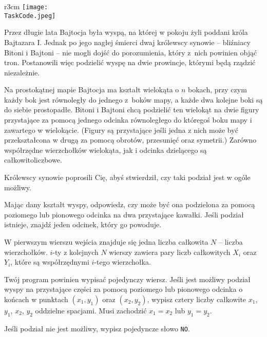 \documentclass{boi2014-pl}
\renewcommand{\TaskCode}{demarcation}
\newcommand{\constant}[1]{{\tt #1}}
\begin{document}
    \begin{wrapfigure}{r}{3cm}
        \vspace{-24pt}
		\texttt{[image: \\TaskCode.jpeg]}
	\end{wrapfigure}

    Przez długie lata Bajtocja była wyspą, na której w pokoju żyli poddani króla Bajtazara I.
  Jednak po jego nagłej śmierci dwaj królewscy synowie -- bliźniacy Bitoni i Bajtoni -- nie
  mogli dojść do porozumienia, który z~nich powinien objąć tron. Postanowili więc podzielić
  wyspę na dwie prowincje, którymi będą rządzić niezależnie.

  Na prostokątnej mapie Bajtocja ma kształt wielokąta o $n$ bokach, przy czym każdy bok jest równoległy
  do jednego z~boków mapy, a każde dwa kolejne boki są do siebie prostopadłe.
  Bitoni i Bajtoni chcą podzielić ten wielokąt na dwie figury przystające za pomocą
  jednego odcinka równoległego do któregoś boku mapy i zawartego w wielokącie.
  (Figury są przystające jeśli jedna z nich może być przekształcona w drugą za pomocą obrotów, przesunięć oraz symetrii.)
  Zarówno współrzędne wierzchołków wielokąta, jak i odcinka dzielącego są całkowitoliczbowe.

  Królewscy synowie poprosili Cię, abyś stwierdził, czy taki podział jest
  w ogóle możliwy.

    \Task

    Mając dany kształt wyspy, odpowiedz, czy może być ona podzielona za pomocą poziomego lub pionowego
    odcinka na dwa przystające kawałki.
    Jeśli podział istnieje, znajdź jeden odcinek, który go powoduje.

    \Input
	W pierwszym wierszu wejścia znajduje się jedna liczba całkowita $N$ -- liczba wierzchołków.
        $i$-ty z kolejnych $N$ wierszy zawiera pary liczb całkowitych $X_i$ oraz $Y_i$, które są współrzędnymi $i$-tego wierzchołka.

	\Output
        Twój program powinien wypisać pojedynczy wiersz.
        Jeśli jest możliwy podział wyspy na przystające części za pomocą poziomego lub pionowego odcinka o
        końcach w punktach $(x_1,y_1)$ oraz $(x_2,y_2)$, wypisz cztery liczby całkowite $x_1$, $y_1$, $x_2$, $y_2$ oddzielne spacjami.
        Musi zachodzić $x_1 = x_2$ lub $y_1 = y_2$.
 
        Jeśli podział nie jest możliwy, wypisz pojedyncze słowo \constant{NO}.

    \clearpage
\end{document}
